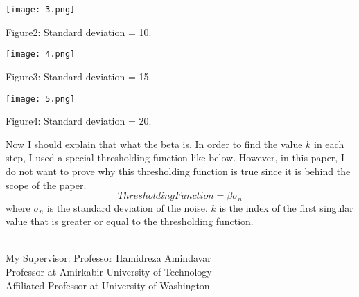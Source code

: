 \documentclass{article}
\begin{document}
\begin{center}
\texttt{[image: 3.png]}
\end{center}
\begin{center}
Figure2: Standard deviation = 10.
\end{center}
\begin{center}
\texttt{[image: 4.png]}
\end{center}
\begin{center}
Figure3: Standard deviation = 15.
\end{center}
\begin{center}
\texttt{[image: 5.png]}
\end{center}
\begin{center}
Figure4: Standard deviation = 20.
\end{center}
Now I should explain that what the beta is. In order to find the value $k$ in each step, I used a special thresholding function like below. However, in this paper, I do not want to prove why this thresholding function is true since it is behind the scope of the paper.\\
\begin{equation}
Thresholding Function = \beta \sigma_n
\end{equation}
where $\sigma_n$ is the standard deviation of the noise. $k$ is the index of the first singular value that is greater or equal to the thresholding function.\\
\\
\begin{center}
\large{My Supervisor: Professor Hamidreza Amindavar\\ Professor at Amirkabir University of Technology\\ Affiliated Professor at University of Washington}
\end{center}
\end{document}
